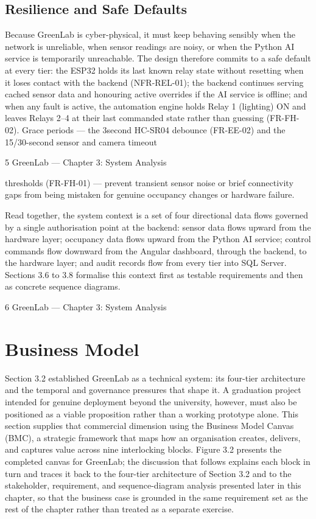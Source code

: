 \subsection{Resilience and Safe Defaults}

Because GreenLab is cyber-physical, it must keep behaving sensibly when the network is
unreliable, when sensor readings are noisy, or when the Python AI service is temporarily
unreachable. The design therefore commits to a safe default at every tier: the ESP32 holds its last
known relay state without resetting when it loses contact with the backend (NFR-REL-01); the
backend continues serving cached sensor data and honouring active overrides if the AI service is
offline; and when any fault is active, the automation engine holds Relay 1 (lighting) ON and leaves
Relays 2--4 at their last commanded state rather than guessing (FR-FH-02). Grace periods --- the 3second HC-SR04 debounce (FR-EE-02) and the 15/30-second sensor and camera timeout


5
GreenLab --- Chapter 3: System Analysis


thresholds (FR-FH-01) --- prevent transient sensor noise or brief connectivity gaps from being
mistaken for genuine occupancy changes or hardware failure.

Read together, the system context is a set of four directional data flows governed by a single
authorisation point at the backend: sensor data flows upward from the hardware layer; occupancy
data flows upward from the Python AI service; control commands flow downward from the
Angular dashboard, through the backend, to the hardware layer; and audit records flow from every
tier into SQL Server. Sections 3.6 to 3.8 formalise this context first as testable requirements and
then as concrete sequence diagrams.




6
GreenLab --- Chapter 3: System Analysis



\section{Business Model}

Section 3.2 established GreenLab as a technical system: its four-tier architecture and the temporal
and governance pressures that shape it. A graduation project intended for genuine deployment
beyond the university, however, must also be positioned as a viable proposition rather than a
working prototype alone. This section supplies that commercial dimension using the Business
Model Canvas (BMC), a strategic framework that maps how an organisation creates, delivers, and
captures value across nine interlocking blocks. Figure 3.2 presents the completed canvas for
GreenLab; the discussion that follows explains each block in turn and traces it back to the four-tier
architecture of Section 3.2 and to the stakeholder, requirement, and sequence-diagram analysis
presented later in this chapter, so that the business case is grounded in the same requirement set as
the rest of the chapter rather than treated as a separate exercise.




